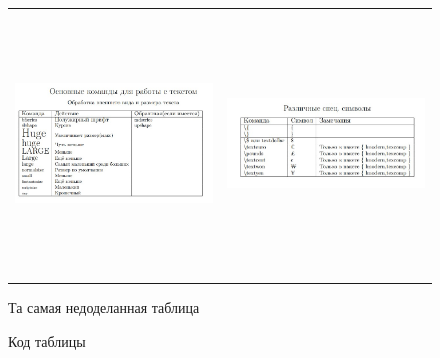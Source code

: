 \documentclass[14pt, a4paper]{extarticle}
\begin{document}
\begin{figure}[h]
\begin{tabular}{cc}
\includegraphics[width=9cm,height=7cm]{table(1)}
&
\includegraphics[width=9cm,height=7cm]{table(2)}
\end{tabular}
\caption{Та самая недоделанная таблица}
\end{figure}
\newpage
\begin{figure}[h!]
\setlength{\fboxsep}{0pt}%
\setlength{\fboxrule}{1pt}%
%
\caption{Код таблицы}
\label{fig:image}
\end{figure}
\end{document}
